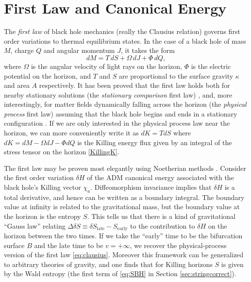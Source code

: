 \documentclass[12pt,a4paper]{article}
\def\be{\begin{equation}}
\def\ee{\end{equation}}
\begin{document}
\section{First Law and Canonical Energy}\label{sec:1st}
The \emph{first law} of black hole mechanics (really the Clausius relation) governs first order variations to thermal equilibrium states. In the case of a black hole of mass $M$, charge $Q$ and angular momentum $J$, it takes the form
\be \label{eq:clausius}
dM = T \,dS + \Omega \,dJ + \Phi \, dQ,
\ee
where $\Omega$ is the angular velocity of light rays on the horizon, $\Phi$ is the electric potential on the horizon, and $T$ and $S$ are proportional to the surface gravity $\kappa$ and area $A$ respectively.  It has been proved that the first law holds both for nearby stationary solutions (the \emph{stationary comparison} first law) \cite{bardeen1973four}, and, more interestingly, for matter fields dynamically falling across the horizon (the \emph{physical process} first law) assuming that the black hole begins and ends in a stationary configuration \cite{wald1994quantum,Gao:2001ut}.  If we are only interested in the physical process law near the horizon, we can more conveniently write it as $dK = T dS$ where $dK = dM - \Omega dJ - \Phi dQ$ is the Killing energy flux given by an integral of the stress tensor on the horizon \eqref{KillingK}.

The first law may be proven most elegantly using Noetherian methods \cite{wald1993black,JKM,iyer1994some,Gao:2001ut}.  Consider the first order variation $\delta H$ of the ADM canonical energy associated with the black hole's Killing vector $\chi_a$.  Diffeomorphism invariance implies that $\delta H$ is a total derivative, and hence can be written as a boundary integral.  The boundary value at infinity is related to the gravitational mass, but the boundary value at the horizon is the entropy $S$.  This tells us that there is a kind of gravitational ``Gauss law'' relating $\Delta \delta S \equiv \delta S_\text{late} - S_\text{early}$ to the contribution to $\delta H$ on the horizon between the two times.  If we take the ``early'' time to be the bifurcation surface $B$ and the late time to be $v = +\infty$, we recover the physical-process version of the first law \eqref{eq:clausius}.  Moreover this framework can be generalized to arbitrary theories of gravity, and one finds that for Killing horizons $S$ is given by the Wald entropy (the first term of \eqref{eq:SBH} in Section \ref{sec:stringcorrect}).
\end{document}
